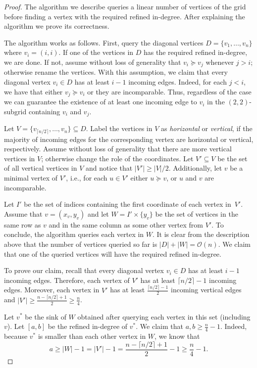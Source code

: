 \documentclass[a4paper,10pt]{article}
\newcommand{\indegree}{refined in-degree\xspace}
\begin{document}
\begin{proof}
The algorithm we describe queries a linear number of vertices of the grid before finding a vertex with the required \indegree. 
After explaining the algorithm we prove its correctness.
  
The algorithm works as follows. First, query the diagonal vertices $D = \{v_1,\ldots, v_n\}$ where $v_i = (i,i)$. If one of the vertices in $D$ has the required \indegree, we are done. If not, assume without loss of generality that $v_i \succeq v_j$ whenever $j > i$; otherwise rename the vertices. 
With this assumption, we claim that every diagonal vertex $v_i \in D$ has at least $i - 1$ incoming edges. Indeed, for each $j < i$, we have that either $v_j \succeq v_i$ or they are incomparable. Thus, regardless of the case we can guarantee the existence of at least one incoming edge to $v_i$ in the $(2, 2)$-subgrid containing $v_i$ and $v_j$. 

Let $V = \{v_{\lceil n/2 \rceil},\ldots,v_n\} \subseteq D$.
Label the vertices in $V$ as \emph{horizontal}  or \emph{vertical}, if the majority of incoming edges for the corresponding vertex are horizontal  or vertical, respectively. 
Assume without loss of generality that there are more vertical vertices in $V$; otherwise change the role of the coordinates. 
Let $V' \subseteq V$ be the set of all vertical vertices in $V$ and notice that $|V'| \geq |V|/2$.
 Additionally, let $v$ be a minimal vertex of $V'$, i.e., for each $u\in V'$ either $u\succeq v$, or $u$ and $v$ are incomparable. 

Let $I'$ be the set of indices containing the first coordinate of each vertex in~$V'$.
Assume that $v = (x_v, y_v)$ and let $W = I'\times \{y_v\}$ be the set of vertices in the same row as $v$ and in the same column as some other vertex from $V'$.
To conclude, the algorithm queries each vertex in $W$.
It is clear from the description above that the number of vertices queried so far is $|D| + |W| = \mathcal{O}(n)$. 
We claim that one of the queried vertices will have the required \indegree.

To prove our claim, recall that every diagonal vertex $v_i \in D$ has at least $i - 1$ incoming edges.  
Therefore, each vertex of $V'$ has at least $\lceil n/2 \rceil - 1$ incoming edges. 
Moreover, each vertex in $V'$ has at least $\frac{\lceil n/2\rceil-1}{2}$ incoming vertical edges and $|V'| \geq \frac{n-\lceil n/2\rceil + 1}{2} \geq \frac{n}{4}$. 

Let $v^*$ be the sink of $W$ obtained after querying each vertex in this set (including $v$). Let $[a,b]$ be the \indegree of $v^*$. We claim that $a, b \geq \frac{n}{4} - 1$. 
Indeed, because $v^*$ is smaller than each other vertex in $W$, we know that $$a \geq |W|-1 = |V'|-1 = \frac{n-\lceil n/2\rceil + 1}{2} - 1 \geq \frac{n}{4} - 1.$$



\end{proof}
\end{document}
